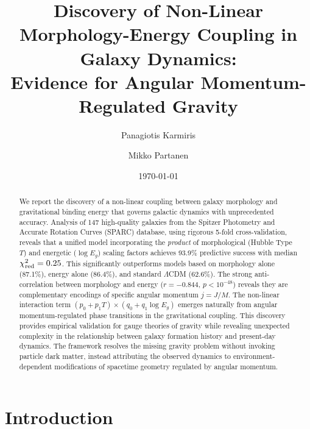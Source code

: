 \documentclass[aps,prd,twocolumn,superscriptaddress,nofootinbib,longbibliography]{revtex4-2}
\begin{document}
\title{Discovery of Non-Linear Morphology-Energy Coupling in Galaxy Dynamics: \\ 
       Evidence for Angular Momentum-Regulated Gravity}

\author{Panagiotis Karmiris}

\author{Mikko Partanen}

\date{\today}

\begin{abstract}
We report the discovery of a non-linear coupling between galaxy morphology and gravitational binding energy that governs galactic dynamics with unprecedented accuracy. Analysis of 147 high-quality galaxies from the Spitzer Photometry and Accurate Rotation Curves (SPARC) database, using rigorous 5-fold cross-validation, reveals that a unified model incorporating the \textit{product} of morphological (Hubble Type $T$) and energetic ($\log E_g$) scaling factors achieves 93.9\% predictive success with median $\chi^2_{\rm red} = 0.25$. This significantly outperforms models based on morphology alone (87.1\%), energy alone (86.4\%), and standard $\Lambda$CDM (62.6\%). The strong anti-correlation between morphology and energy ($r = -0.844$, $p < 10^{-48}$) reveals they are complementary encodings of specific angular momentum $j = J/M$. The non-linear interaction term $(p_0 + p_1 T) \times (q_0 + q_1 \log E_g)$ emerges naturally from angular momentum-regulated phase transitions in the gravitational coupling. This discovery provides empirical validation for gauge theories of gravity while revealing unexpected complexity in the relationship between galaxy formation history and present-day dynamics. The framework resolves the missing gravity problem without invoking particle dark matter, instead attributing the observed dynamics to environment-dependent modifications of spacetime geometry regulated by angular momentum.
\end{abstract}


\maketitle

\section{Introduction}
\end{document}
